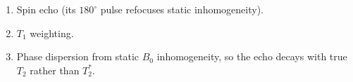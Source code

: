 \begin{enumerate}[leftmargin=1.6em,itemsep=2pt]
\item Spin echo (its $180^{\circ}$ pulse refocuses static inhomogeneity).
\item $T_1$ weighting.
\item Phase dispersion from static $B_0$ inhomogeneity, so the echo decays with true $T_2$ rather than $T_2^{*}$.
\end{enumerate}
